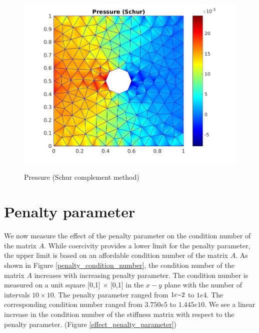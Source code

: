 \documentclass[a4paper]{book}
\newcommand{\minus}{\scalebox{0.75}[1.0]{$-$}}
\begin{document}
\begin{figure}
\begin{minipage}[c]{0.3\textwidth}
     \label{y_vel_stoke_schur}
  \end{minipage}
  \begin{minipage}[c]{0.67\textwidth}
    \includegraphics[width=\textwidth]{cylinder_schur_pressure.jpg}
  \end{minipage}\hfill
  \begin{minipage}[c]{0.3\textwidth}
    \caption{Pressure (Schur complement method)}
      \label{pressure_stoke_schur}
  \end{minipage}
\caption{\label{flow_over_cylinder_schur}}
\end{figure}

\newpage

\section{Penalty parameter}

We now measure the effect of the penalty parameter on the condition number of the matrix $A$. While coercivity provides a lower limit for the penalty parameter, the upper limit is based on an affordable condition number of the matrix $A$. As shown in Figure \ref{penalty_condition_number}, the condition number of the matrix $A$ increases with increasing penalty parameter.
The condition number is measured on a unit square [0,1] $\times$ [0,1] in the $x-y$ plane with the number of intervals $10 \times 10$. The penalty parameter ranged from $1e \minus 2$ to $1e4$. The corresponding condition number ranged from $3.750e5$ to $1.445e10$. We see a linear increase in the condition number of the stiffness matrix with respect to the penalty parameter. (Figure \ref{effect_penalty_parameter})
\end{document}

